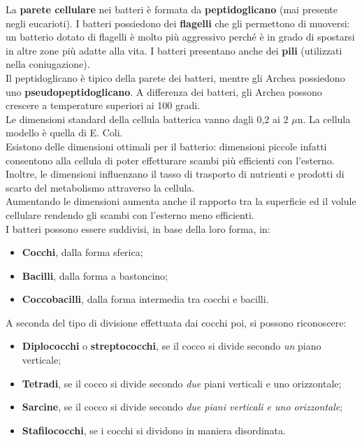 \documentclass[11pt]{book}
\begin{document}
La \textbf{parete cellulare} nei batteri è formata da \textbf{peptidoglicano} (mai presente negli eucarioti).
I batteri possiedono dei \textbf{flagelli} che gli permettono di muoversi: un batterio dotato di flagelli è molto più aggressivo perché è in grado di spostarsi in altre zone più adatte alla vita.
I batteri presentano anche dei \textbf{pili} (utilizzati nella coniugazione).\\

Il peptidoglicano è tipico della parete dei batteri, mentre gli Archea possiedono uno \textbf{pseudopeptidoglicano}.
A differenza dei batteri, gli Archea possono crescere a temperature superiori ai 100 gradi.\\

Le dimensioni standard della cellula batterica vanno dagli 0,2 ai 2 $\mu$n.
La cellula modello è quella di E. Coli.\\

Esistono delle dimensioni ottimali per il batterio: dimensioni piccole infatti consentono alla cellula di poter effetturare scambi più efficienti con l'esterno. Inoltre, le dimensioni influenzano il tasso di trasporto di nutrienti e prodotti di scarto del metabolismo attraverso la cellula.\\

Aumentando le dimensioni aumenta anche il rapporto tra la superficie ed il volule cellulare rendendo gli scambi con l'esterno meno efficienti.\\

I batteri possono essere suddivisi, in base della loro forma, in:
\begin{itemize}
\item \textbf{Cocchi}, dalla forma sferica;
\item \textbf{Bacilli}, dalla forma a bastoncino;
\item \textbf{Coccobacilli}, dalla forma intermedia tra cocchi e bacilli.
\end{itemize}

A seconda del tipo di divisione effettuata dai cocchi poi, si possono riconoscere:
\begin{itemize}
\item \textbf{Diplococchi} o \textbf{streptococchi}, se il cocco si divide secondo \emph{un} piano verticale;
\item \textbf{Tetradi}, se il cocco si divide secondo \emph{due} piani verticali e uno orizzontale;
\item \textbf{Sarcine}, se il cocco si divide secondo \emph{due piani verticali e uno orizzontale};
\item \textbf{Stafilococchi}, se i cocchi si dividono in maniera disordinata.
\end{itemize}
\end{document}
